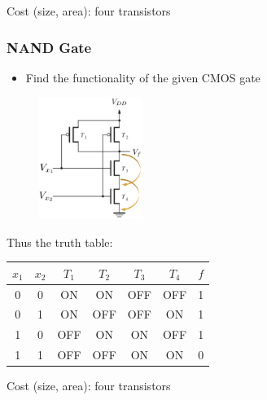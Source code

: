 \documentclass[12pt,openany, tikz,border=10pt]{book}
\begin{document}
			      	Cost (size, area): four transistors
			      	
			      	\subsubsection{NAND Gate}
			      	\begin{itemize}
			      		\item Find the functionality of the given CMOS gate
			      	\end{itemize}
			      	      
			      	\begin{figure}[h]
			      		\centering
			      		\includegraphics[width=0.3\textwidth]{circuits/9.1.5_2.png} %
			      	\end{figure}
			      	      
			      	
			      	Thus the truth table: 
			      	\begin{center}
			      		\begin{tabular}{ |c|c||c|c|c|c||c| }
			      			\hline
			      			\( x_1 \) & \( x_2 \) & \( T_1 \) & \( T_2 \) & \( T_3 \) & \( T_4 \) & \( f \) \\
			      			\hline
			      			0         & 0         & ON        & ON        & OFF       & OFF       & 1       \\
			      			0         & 1         & ON        & OFF       & OFF       & ON        & 1       \\
			      			1         & 0         & OFF       & ON        & ON        & OFF       & 1       \\
			      			1         & 1         & OFF       & OFF       & ON        & ON        & 0       \\
			      			\hline
			      		\end{tabular}
			      	\end{center}
			      	      
			      	Cost (size, area): four transistors
			      	
\end{document}
